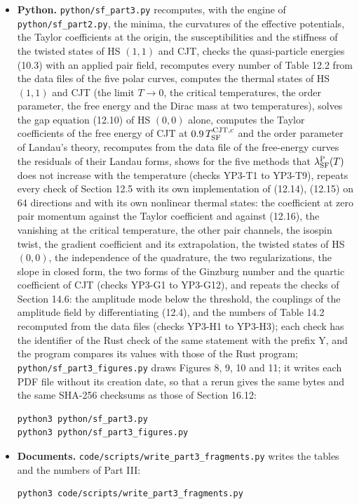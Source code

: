 \documentclass[
  10pt,
]{article}
\begin{document}
\begin{itemize}
  Output: \texttt{data/hck\_part3\_checks.txt} (the report) and the data
  files of Section 16.12; about fifteen minutes on two processor cores
  (899 s in the run of the report; the free energy at finite temperature
  takes most of it: near the critical temperature the iterations
  converge slowly).
\item
  \textbf{Python.} \texttt{python/sf\_part3.py} recomputes, with the
  engine of \texttt{python/sf\_part2.py}, the minima, the curvatures of
  the effective potentials, the Taylor coefficients at the origin, the
  susceptibilities and the stiffness of the twisted states of HS
  \((1,1)\) and CJT, checks the quasi-particle energies (10.3) with an
  applied pair field, recomputes every number of Table 12.2 from the
  data files of the five polar curves, computes the thermal states of HS
  \((1,1)\) and CJT (the limit \(T\to0\), the critical temperatures, the
  order parameter, the free energy and the Dirac mass at two
  temperatures), solves the gap equation (12.10) of HS \((0,0)\) alone,
  computes the Taylor coefficients of the free energy of CJT at
  \(0.9\,T^{\rm CJT,c}_{\rm SF}\) and the order parameter of Landau's
  theory, recomputes from the data file of the free-energy curves the
  residuals of their Landau forms, shows for the five methods that
  \(\lambda^{\rm P}_{\rm SF}(T)\) does not increase with the temperature
  (checks YP3-T1 to YP3-T9), repeats every check of Section 12.5 with
  its own implementation of (12.14), (12.15) on 64 directions and with
  its own nonlinear thermal states: the coefficient at zero pair
  momentum against the Taylor coefficient and against (12.16), the
  vanishing at the critical temperature, the other pair channels, the
  isospin twist, the gradient coefficient and its extrapolation, the
  twisted states of HS \((0,0)\), the independence of the quadrature,
  the two regularizations, the slope in closed form, the two forms of
  the Ginzburg number and the quartic coefficient of CJT (checks YP3-G1
  to YP3-G12), and repeats the checks of Section 14.6: the amplitude
  mode below the threshold, the couplings of the amplitude field by
  differentiating (12.4), and the numbers of Table 14.2 recomputed from
  the data files (checks YP3-H1 to YP3-H3); each check has the
  identifier of the Rust check of the same statement with the prefix Y,
  and the program compares its values with those of the Rust program;
  \texttt{python/sf\_part3\_figures.py} draws Figures 8, 9, 10 and 11;
  it writes each PDF file without its creation date, so that a rerun
  gives the same bytes and the same SHA-256 checksums as those of
  Section 16.12:

\begin{verbatim}
python3 python/sf_part3.py
python3 python/sf_part3_figures.py
\end{verbatim}
\item
  \textbf{Documents.} \texttt{code/scripts/write\_part3\_fragments.py}
  writes the tables and the numbers of Part III:

\begin{verbatim}
python3 code/scripts/write_part3_fragments.py
\end{verbatim}
\end{itemize}
\end{document}
